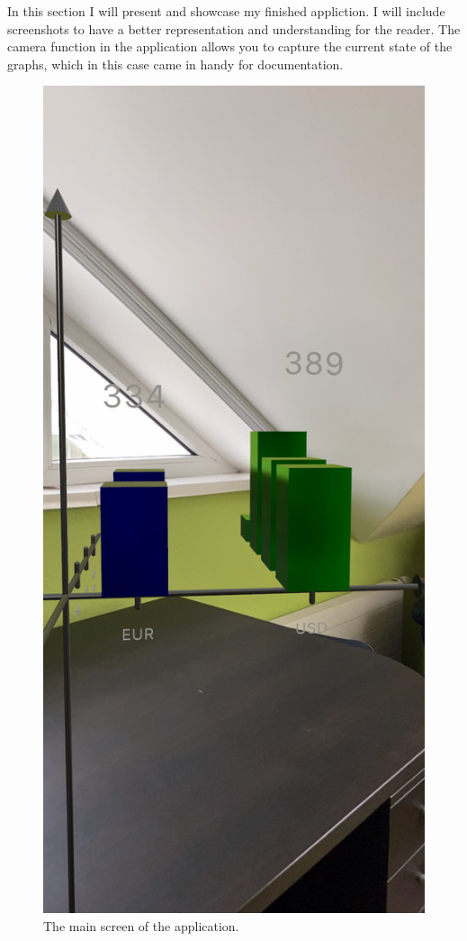 \documentclass[11pt,a4paper,oneside]{report}
\begin{document}
In this section I will present and showcase my finished appliction. I will include screenshots to have a better representation and understanding for the reader.
The camera function in the application allows you to capture the current state of the graphs, which in this case came in handy for documentation.


\begin{figure}[!ht]
  \centering
  \includegraphics[scale=0.2]{front.jpeg}
  \caption{The main screen of the application.}
  \label{fig:TexnicCenter}
\end{figure}
\end{document}
